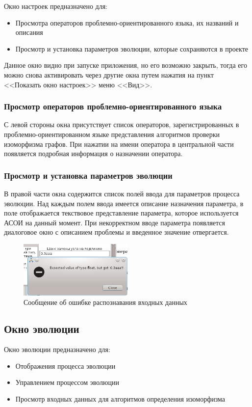 \documentclass[russian,utf8,emptystyle]{eskdtext}
\begin{document}
Окно настроек предназначено для:
\begin{itemize}
\item Просмотра операторов проблемно-ориентированного языка, их названий и описания
\item Просмотр и установка параметров эволюции, которые сохраняются в проекте
\end{itemize}

Данное окно видно при запуске приложения, но его возможно закрыть, тогда его можно снова активировать через другие окна путем нажатия на пункт <<Показать окно настроек>> меню <<Вид>>.

\subsubsection{Просмотр операторов проблемно-ориентированного языка}
С левой стороны окна присутствует список операторов, зарегистрированных в проблемно-ориентированном языке представления алгоритмов проверки изоморфизма графов. При нажатии на имени оператора в центральной части появляется подробная информация о назначении оператора.

\subsubsection{Просмотр и установка параметров эволюции}
В правой части окна содержится список полей ввода для параметров процесса эволюции. Над каждым полем ввода имеется описание назначения параметра, в поле отображается текствовое представление параметра, которое используется АСОИ на данный момент. При некорректном вводе параметра появляется диалоговое окно с описанием проблемы и введенное значение отвергается.

\begin{figure}[h!]
\centering
\includegraphics[width=0.5\textwidth]{screen08}
\caption{Сообщение об ошибке распознавания входных данных}
\end{figure}

\subsection{Окно эволюции}
Окно эволюции предназначено для:
\begin{itemize}
\item Отображения процесса эволюции
\item Управлением процессом эволюции
\item Просмотр входных данных для алгоритмов определения изоморфизма
\end{itemize}
\end{document}
